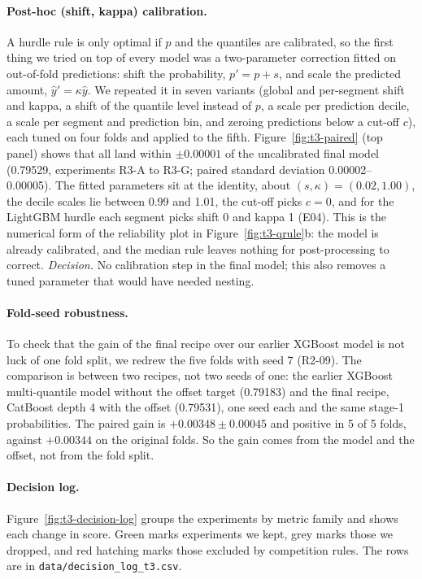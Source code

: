 \documentclass[../main.tex]{subfiles}
\begin{document}
\paragraph{Post-hoc (shift, kappa) calibration.} A hurdle rule is only optimal if $p$ and the quantiles are calibrated, so the first thing we tried on top of every model was a two-parameter correction fitted on out-of-fold predictions: shift the probability, $p'=p+s$, and scale the predicted amount, $\hat y'=\kappa\hat y$. We repeated it in seven variants (global and per-segment shift and kappa, a shift of the quantile level instead of $p$, a scale per prediction decile, a scale per segment and prediction bin, and zeroing predictions below a cut-off $c$), each tuned on four folds and applied to the fifth. Figure~\ref{fig:t3-paired} (top panel) shows that all land within $\pm0.00001$ of the uncalibrated final model (0.79529, experiments R3-A to R3-G; paired standard deviation 0.00002--0.00005). The fitted parameters sit at the identity, about $(s,\kappa)=(0.02,1.00)$, the decile scales lie between 0.99 and 1.01, the cut-off picks $c=0$, and for the LightGBM hurdle each segment picks shift 0 and kappa 1 (E04). This is the numerical form of the reliability plot in Figure~\ref{fig:t3-qrule}b: the model is already calibrated, and the median rule leaves nothing for post-processing to correct. \emph{Decision.} No calibration step in the final model; this also removes a tuned parameter that would have needed nesting.

\paragraph{Fold-seed robustness.} To check that the gain of the final recipe over our earlier XGBoost model is not luck of one fold split, we redrew the five folds with seed 7 (R2-09). The comparison is between two recipes, not two seeds of one: the earlier XGBoost multi-quantile model without the offset target (0.79183) and the final recipe, CatBoost depth 4 with the offset (0.79531), one seed each and the same stage-1 probabilities. The paired gain is $+0.00348\pm0.00045$ and positive in 5 of 5 folds, against $+0.00344$ on the original folds. So the gain comes from the model and the offset, not from the fold split.

\paragraph{Decision log.} Figure~\ref{fig:t3-decision-log} groups the experiments by metric family and shows each change in score. Green marks experiments we kept, grey marks those we dropped, and red hatching marks those excluded by competition rules. The rows are in \texttt{data/decision\_log\_t3.csv}.
\end{document}
